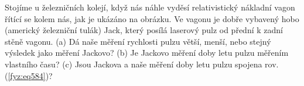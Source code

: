 \begin{mdframed}[style=mdexam]
  \begin{example}\label{fyz:fey_exam020}
    Stojíme u železničních kolejí, když nás náhle vyděsí relativistický nákladní vagon řítící se
    kolem nás, jak je ukázáno na obrázku. Ve vagonu je dobře vybavený hobo (americký železniční
    tulák) Jack, který posílá laserový pulz od přední k zadní stěně vagonu. (a) Dá naše měření
    rychlosti pulzu větší, menší, nebo stejný výsledek jako měření Jackovo? (b) Je Jackovo měření
    doby letu pulzu měřením vlastního času? (c) Jsou Jackova a naše měření doby letu pulzu spojena
    rov. (\ref{fyz:eq584})?

    {\centering
    \captionsetup{type=figure}
    \par}  
  \end{example}
\end{mdframed}